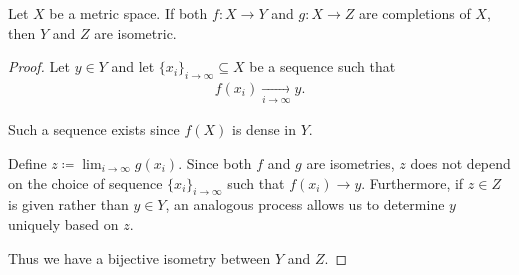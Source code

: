 \begin{proposition}\label{thm:metric_space_completion_uniqueness}
  Let \( X \) be a metric space. If both \( f: X \to Y \) and \( g: X \to Z \) are completions of \( X \), then \( Y \) and \( Z \) are isometric.
\end{proposition}
\begin{proof}
  Let \( y \in Y \) and let \( \{ x_i \}_{i \to \infty} \subseteq X \) be a sequence such that
  \begin{align*}
    f(x_i) \xrightarrow[i \to \infty]{} y.
  \end{align*}

  Such a sequence exists since \( f(X) \) is dense in \( Y \).

  Define \( z \coloneqq \lim_{i \to \infty} g(x_i) \). Since both \( f \) and \( g \) are isometries, \( z \) does not depend on the choice of sequence \( \{ x_i \}_{i \to \infty} \) such that \( f(x_i) \to y \). Furthermore, if \( z \in Z \) is given rather than \( y \in Y \), an analogous process allows us to determine \( y \) uniquely based on \( z \).

  Thus we have a bijective isometry between \( Y \) and \( Z \).
\end{proof}
